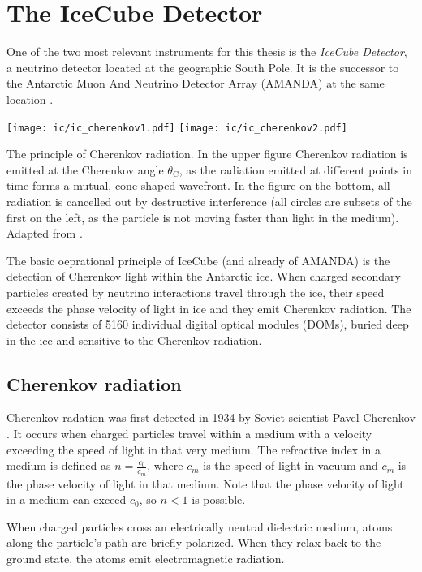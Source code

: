 \chapter{The IceCube Detector} \label{ic}
One of the two most relevant instruments for this thesis is the \textit{IceCube Detector}, a neutrino detector located at the geographic South Pole. It is the successor to the Antarctic Muon And Neutrino Detector Array (AMANDA) at the same location . 
\begin{marginfigure}
    \texttt{[image: ic/ic\_cherenkov1.pdf]}
    \texttt{[image: ic/ic\_cherenkov2.pdf]}
    \caption[Cherenkov radiation]{The principle of Cherenkov radiation. In the upper figure Cherenkov radiation is emitted at the Cherenkov angle $\theta_\text{C}$, as the radiation emitted at different points in time forms a mutual, cone-shaped wavefront. In the figure on the bottom, all radiation is cancelled out by destructive interference (all circles are subsets of the first on the left, as the particle is not moving faster than light in the medium). Adapted from \cite{LAnnunziata2020}.}
\end{marginfigure}
The basic oeprational principle of IceCube (and already of AMANDA) is the detection of Cherenkov light within the Antarctic ice. When charged secondary particles created by neutrino interactions travel through the ice, their speed exceeds the phase velocity of light in ice and they emit Cherenkov radiation. The detector consists of 5160 individual digital optical modules (DOMs), buried deep in the ice and sensitive to the Cherenkov radiation.

\section{Cherenkov radiation} \label{cherenkov_radiation}

Cherenkov radation was first detected in 1934 by Soviet scientist Pavel Cherenkov . It occurs when charged particles travel within a medium with a velocity exceeding the speed of light in that very medium. The refractive index in a medium is defined as $n=\frac{c_0}{c_m}$, where $c_m$ is the speed of light in vacuum and $c_m$ is the phase velocity of light in that medium. Note that the phase velocity of light in a medium can exceed $c_0$, so $n<1$ is possible. 

When charged particles cross an electrically neutral dielectric medium, atoms along the particle's path are briefly polarized. When they relax back to the ground state, the atoms emit electromagnetic radiation.


